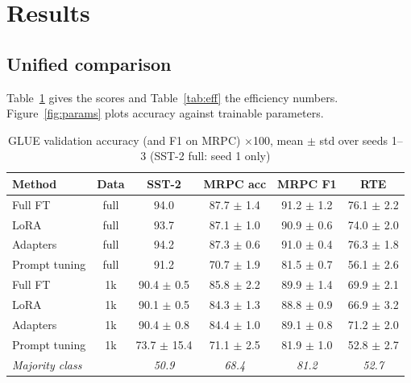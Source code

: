 \documentclass{nle}
\begin{document}
\section{Results}

\subsection{Unified comparison}

Table~\ref{tab:main} gives the scores and Table~\ref{tab:eff} the efficiency numbers. Figure~\ref{fig:params} plots accuracy against trainable parameters.

\begin{table}
  \caption{GLUE validation accuracy (and F1 on MRPC) $\times$100, mean $\pm$ std over seeds 1--3 (SST-2 full: seed 1 only)}
  \label{tab:main}
  \begin{minipage}{\textwidth}
    \begin{tabular}{lccccc}
    \hline\hline
    Method & Data & SST-2 & MRPC acc & MRPC F1 & RTE \\
    \hline
    Full FT & full & 94.0 & 87.7 $\pm$ 1.4 & 91.2 $\pm$ 1.2 & 76.1 $\pm$ 2.2 \\
    LoRA & full & 93.7 & 87.1 $\pm$ 1.0 & 90.9 $\pm$ 0.6 & 74.0 $\pm$ 2.0 \\
    Adapters & full & 94.2 & 87.3 $\pm$ 0.6 & 91.0 $\pm$ 0.4 & 76.3 $\pm$ 1.8 \\
    Prompt tuning & full & 91.2 & 70.7 $\pm$ 1.9 & 81.5 $\pm$ 0.7 & 56.1 $\pm$ 2.6 \\
    \hline
    Full FT & 1k & 90.4 $\pm$ 0.5 & 85.8 $\pm$ 2.2 & 89.9 $\pm$ 1.4 & 69.9 $\pm$ 2.1 \\
    LoRA & 1k & 90.1 $\pm$ 0.5 & 84.3 $\pm$ 1.3 & 88.8 $\pm$ 0.9 & 66.9 $\pm$ 3.2 \\
    Adapters & 1k & 90.4 $\pm$ 0.8 & 84.4 $\pm$ 1.0 & 89.1 $\pm$ 0.8 & 71.2 $\pm$ 2.0 \\
    Prompt tuning & 1k & 73.7 $\pm$ 15.4 & 71.1 $\pm$ 2.5 & 81.9 $\pm$ 1.0 & 52.8 $\pm$ 2.7 \\
    \hline
    {\it Majority class} & & {\it 50.9} & {\it 68.4} & {\it 81.2} & {\it 52.7} \\
    \hline\hline
    \end{tabular}
  \end{minipage}
\end{table}
\end{document}
